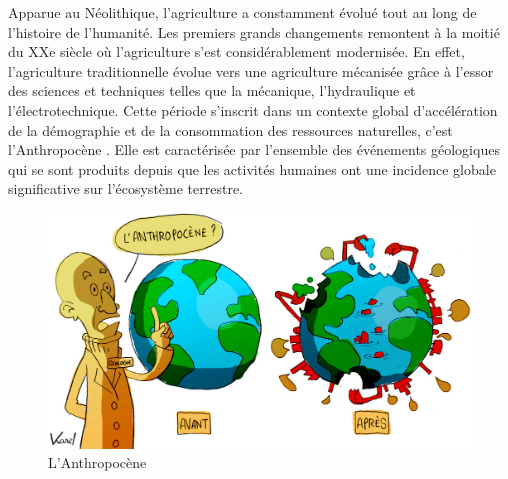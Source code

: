 \documentclass[../thesis.tex]{subfiles}
\begin{document}
    \par Apparue au Néolithique, l'agriculture a constamment évolué tout au long de l'histoire de l'humanité. Les premiers grands changements remontent à la moitié du XXe siècle où l'agriculture s'est considérablement modernisée. En effet, l'agriculture traditionnelle évolue vers une agriculture mécanisée grâce à l'essor des sciences et techniques telles que la mécanique, l'hydraulique et l'électrotechnique. Cette période s'inscrit dans un contexte global d'accélération de la démographie et de la consommation des ressources naturelles, c'est l'Anthropocène \cite{federau2016philosophie}. Elle est caractérisée par l'ensemble des événements géologiques qui se sont produits depuis que les activités humaines ont une incidence globale significative sur l'écosystème terrestre.
    
    \begin{figure}[H]
        \centering
        \includegraphics[width=0.4\linewidth]{./img/intro/intro-anthropocene.jpg}
        \caption{L'Anthropocène}
        \label{fig:02-anthropocène}
    \end{figure}
    
    
\end{document}
